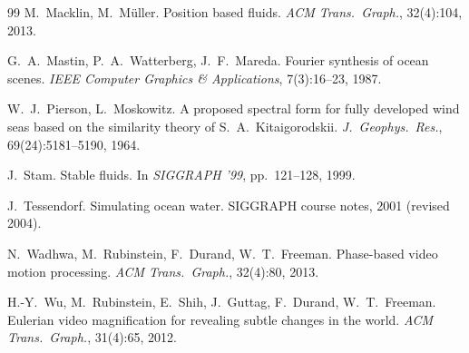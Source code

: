 \documentclass[11pt,a4paper]{article}
\begin{document}
\begin{thebibliography}{99}
M.~Macklin, M.~M\"uller.
\newblock Position based fluids.
\newblock \emph{ACM Trans.\ Graph.}, 32(4):104, 2013.

G.~A.~Mastin, P.~A.~Watterberg, J.~F.~Mareda.
\newblock Fourier synthesis of ocean scenes.
\newblock \emph{IEEE Computer Graphics \& Applications}, 7(3):16--23, 1987.

W.~J.~Pierson, L.~Moskowitz.
\newblock A proposed spectral form for fully developed wind seas based
on the similarity theory of S.~A.~Kitaigorodskii.
\newblock \emph{J.\ Geophys.\ Res.}, 69(24):5181--5190, 1964.

J.~Stam.
\newblock Stable fluids.
\newblock In \emph{SIGGRAPH '99}, pp.~121--128, 1999.

J.~Tessendorf.
\newblock Simulating ocean water.
\newblock SIGGRAPH course notes, 2001 (revised 2004).

N.~Wadhwa, M.~Rubinstein, F.~Durand, W.~T.~Freeman.
\newblock Phase-based video motion processing.
\newblock \emph{ACM Trans.\ Graph.}, 32(4):80, 2013.

H.-Y.~Wu, M.~Rubinstein, E.~Shih, J.~Guttag, F.~Durand, W.~T.~Freeman.
\newblock Eulerian video magnification for revealing subtle changes in
the world.
\newblock \emph{ACM Trans.\ Graph.}, 31(4):65, 2012.

\end{thebibliography}
\endgroup
\end{document}
